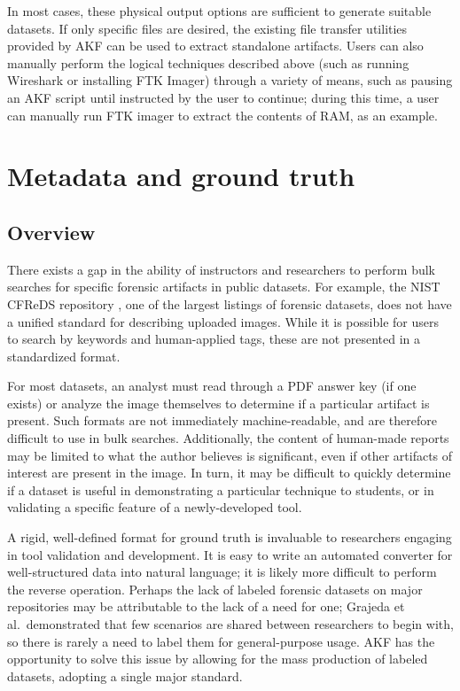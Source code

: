 \documentclass[letterpaper,12pt]{report}
\begin{document}
In most cases, these physical output options are sufficient to generate
suitable datasets. If only specific files are desired, the existing file
transfer utilities provided by AKF can be used to extract standalone
artifacts. Users can also manually perform the logical techniques
described above (such as running Wireshark or installing FTK Imager)
through a variety of means, such as pausing an AKF script until
instructed by the user to continue; during this time, a user can
manually run FTK imager to extract the contents of RAM, as an example.

\section{Metadata and ground
truth}\label{metadata-and-ground-truth}

\subsection{Overview}\label{overview-1}

There exists a gap in the ability of instructors and researchers to
perform bulk searches for specific forensic artifacts in public
datasets. For example, the NIST CFReDS repository
\cite{nationalinstituteofstandardsandtechnologyCFReDSPortal}, one of
the largest listings of forensic datasets, does not have a unified
standard for describing uploaded images. While it is possible for users
to search by keywords and human-applied tags, these are not presented in
a standardized format.

For most datasets, an analyst must read through a PDF answer key (if one
exists) or analyze the image themselves to determine if a particular
artifact is present. Such formats are not immediately machine-readable,
and are therefore difficult to use in bulk searches. Additionally, the
content of human-made reports may be limited to what the author believes
is significant, even if other artifacts of interest are present in the
image. In turn, it may be difficult to quickly determine if a dataset is
useful in demonstrating a particular technique to students, or in
validating a specific feature of a newly-developed tool.

A rigid, well-defined format for ground truth is invaluable to
researchers engaging in tool validation and development. It is easy to
write an automated converter for well-structured data into natural
language; it is likely more difficult to perform the reverse operation.
Perhaps the lack of labeled forensic datasets on major repositories may
be attributable to the lack of a need for one; Grajeda et
al.~demonstrated that few scenarios are shared between researchers to
begin with, so there is rarely a need to label them for general-purpose
usage. AKF has the opportunity to solve this issue by allowing for the
mass production of labeled datasets, adopting a single major standard.
\end{document}
